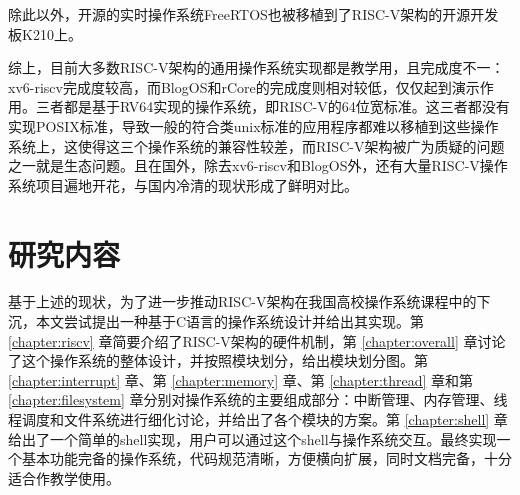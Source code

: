 除此以外，开源的实时操作系统FreeRTOS也被移植到了RISC-V架构的开源开发板K210上。

综上，目前大多数RISC-V架构的通用操作系统实现都是教学用，且完成度不一：xv6-riscv完成度较高，而BlogOS和rCore的完成度则相对较低，仅仅起到演示作用。三者都是基于RV64实现的操作系统，即RISC-V的64位宽标准。这三者都没有实现POSIX标准，导致一般的符合类unix标准的应用程序都难以移植到这些操作系统上，这使得这三个操作系统的兼容性较差，而RISC-V架构被广为质疑的问题之一就是生态问题。且在国外，除去xv6-riscv和BlogOS外，还有大量RISC-V操作系统项目遍地开花，与国内冷清的现状形成了鲜明对比。

\section{研究内容}

基于上述的现状，为了进一步推动RISC-V架构在我国高校操作系统课程中的下沉，本文尝试提出一种基于C语言的操作系统设计并给出其实现。第 \ref{chapter:riscv} 章简要介绍了RISC-V架构的硬件机制，第 \ref{chapter:overall} 章讨论了这个操作系统的整体设计，并按照模块划分，给出模块划分图。第 \ref{chapter:interrupt} 章、第 \ref{chapter:memory} 章、第 \ref{chapter:thread} 章和第 \ref{chapter:filesystem} 章分别对操作系统的主要组成部分：中断管理、内存管理、线程调度和文件系统进行细化讨论，并给出了各个模块的方案。第 \ref{chapter:shell} 章给出了一个简单的shell实现，用户可以通过这个shell与操作系统交互。最终实现一个基本功能完备的操作系统，代码规范清晰，方便横向扩展，同时文档完备，十分适合作教学使用。